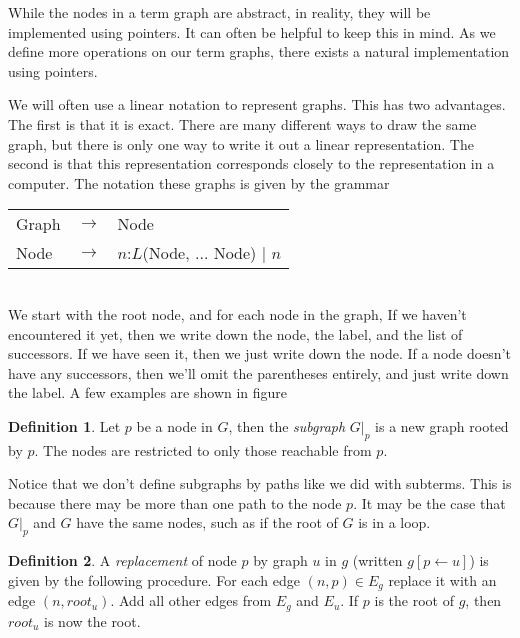 \documentclass{article}
\theoremstyle{definition}
\newtheorem{definition}{Definition}[section]
\begin{document}

While the nodes in a term graph are abstract, in reality, they will be implemented using pointers.
It can often be helpful to keep this in mind. 
As we define more operations on our term graphs, there exists a natural implementation using pointers.

We will often use a linear notation to represent graphs.
This has two advantages.
The first is that it is exact.
There are many different ways to draw the same graph,
but there is only one way to write it out a linear representation.
The second is that this representation corresponds closely to the representation in a computer.
The notation these graphs is given by the grammar
\begin{tabular}{lll}
    Graph & $\rightarrow$ & Node \\
    Node  & $\rightarrow$ & $n$:$L$(Node, $\ldots$ Node) | $n$\\
\end{tabular}\\
We start with the root node, and for each node in the graph, If we haven't encountered
it yet, then we write down the node, the label, and the list of successors.
If we have seen it, then we just write down the node.
If a node doesn't have any successors, then we'll omit the parentheses entirely, and just write down the label.
A few examples are shown in figure %


\theoremstyle{definition}
\begin{definition}
Let $p$ be a node in $G$, then the \textit{subgraph} $G|_p$ is a new graph rooted by $p$.
The nodes are restricted to only those reachable from $p$.
\end{definition}

Notice that we don't define subgraphs by paths like we did with subterms.
This is because there may be more than one path to the node $p$.
It may be the case that $G|_p$ and $G$ have the same nodes, such as if the root of $G$ is in a loop.

\theoremstyle{definition}
\begin{definition}
A \textit{replacement} of node $p$ by graph $u$ in $g$ (written $g[p \leftarrow u]$) is given by the following procedure.
For each edge $(n,p) \in E_g$ replace it with an edge $(n, root_u)$.
Add all other edges from $E_g$ and $E_u$.
If $p$ is the root of $g$, then $root_u$ is now the root.
\end{definition}
\end{document}
